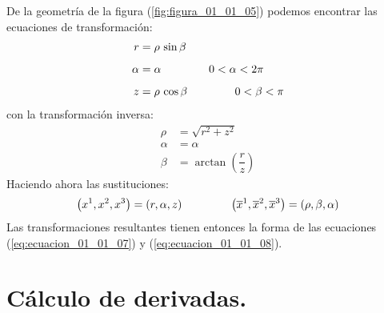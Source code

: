 \documentclass[hidelinks,12pt]{article}
\begin{document}
De la geometría de la figura (\ref{fig:figura_01_01_05}) podemos encontrar las ecuaciones de transformación:
\begin{align*}
r &= \rho \, \sin \beta \\[0.5em]
\alpha &= \alpha \hspace{1.5cm} 0 < \alpha < 2 \pi \\[0.5em]
z &= \rho \, \cos \beta \hspace{1.5cm} 0 < \beta < \pi
\end{align*}
con la transformación inversa:
\begin{align*}
\rho &= \sqrt{r^{2} + z^{2}} \\[0.5em]
\alpha &= \alpha \\[0.5em]
\beta &= \arctan \left( \dfrac{r}{z} \right)
\end{align*}
Haciendo ahora las sustituciones:
\begin{align*}
\left( x^{1}, x^{2}, x^{3} \right) = \left( r, \alpha, z \right) \hspace{1.5cm} \left( \overline{x}^{1}, \overline{x}^{2}, \overline{x}^{3} \right) = \left( \rho, \beta, \alpha \right)
\end{align*}
Las transformaciones resultantes tienen entonces la forma de las ecuaciones (\ref{eq:ecuacion_01_01_07}) y (\ref{eq:ecuacion_01_01_08}).

\section{Cálculo de derivadas.}
\end{document}
